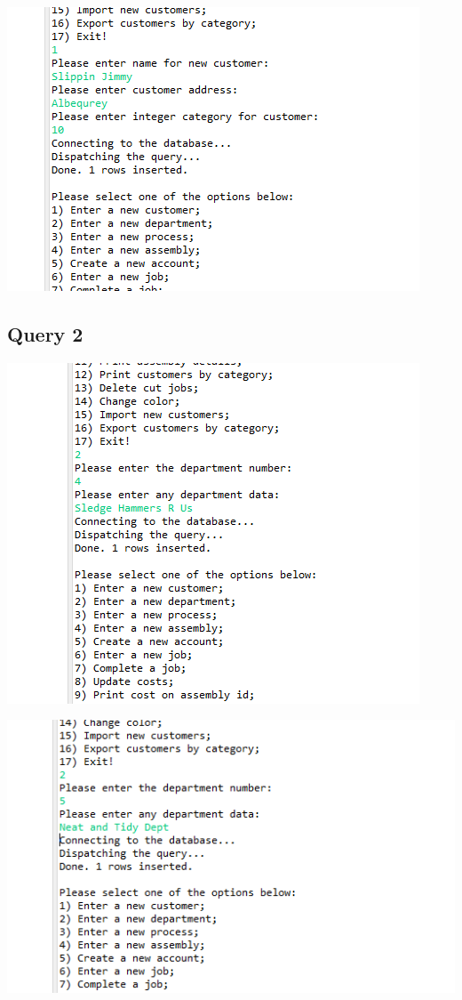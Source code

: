 \documentclass[11pt]{article}
\begin{document}
\includegraphics[width = \textwidth]{insertCust5.png}

\subsection{Query 2}
\includegraphics[width = \textwidth]{dept1.png}

\includegraphics[width = \textwidth]{dept2.png}
\end{document}
